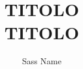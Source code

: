\documentclass{unicam_thesis}
\title{TITOLO \\ TITOLO }
\author{Sass Name}%
\theoremstyle{definition} \newtheorem{esempio}{Esempio}[chapter]
\theoremstyle{definition}
\begin{document}
\maketitle

\tableofcontents
\lstlistoflistings
\listoffigures
\listoftables







\appendix
%
%
%

\printbibliography

\printindex


\end{document}
